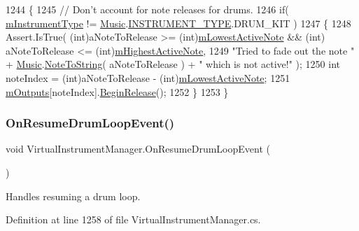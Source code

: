\begin{DoxyCode}
1244     \{
1245         \textcolor{comment}{// Don't account for note releases for drums.}
1246         \textcolor{keywordflow}{if}( \hyperlink{group___v_i_m_priv_ga108c350257b3a2080e06cd4a8251f6a4}{mInstrumentType} != \hyperlink{class_music}{Music}.\hyperlink{group___music_enums_gabfce60192305965558a36e368ebd67c3}{INSTRUMENT\_TYPE}.DRUM\_KIT )
1247         \{
1248             Assert.IsTrue( (\textcolor{keywordtype}{int})aNoteToRelease >= (\textcolor{keywordtype}{int})\hyperlink{group___v_i_m_priv_ga5e3a5116e0dabb37e0ea21d73ac1567e}{mLowestActiveNote} && (\textcolor{keywordtype}{int})
      aNoteToRelease <= (\textcolor{keywordtype}{int})\hyperlink{group___v_i_m_priv_ga73a09a4e4f09c0e5b3871dc9ad6c757e}{mHighestActiveNote},
1249                 \textcolor{stringliteral}{"Tried to fade out the note "} + \hyperlink{class_music}{Music}.\hyperlink{group___music_stat_func_ga85a22c905d56d4c5f4e62159bfecee8c}{NoteToString}( aNoteToRelease ) + \textcolor{stringliteral}{"
       which is not active!"} );
1250             \textcolor{keywordtype}{int} noteIndex = (int)aNoteToRelease - (\textcolor{keywordtype}{int})\hyperlink{group___v_i_m_priv_ga5e3a5116e0dabb37e0ea21d73ac1567e}{mLowestActiveNote};
1251             \hyperlink{group___v_i_m_priv_ga53f837fd01475fa35629a650e7fa00e3}{mOutputs}[noteIndex].\hyperlink{group___n_o_o_pub_func_ga044e62759958d717c7fa4fd1615e2ec1}{BeginRelease}();
1252         \}
1253     \}
\end{DoxyCode}
\mbox{\label{group___v_i_m_handlers_ga97e3e73e05a7ab6027f25573712367a2}} 
\subsubsection{\texorpdfstring{On\+Resume\+Drum\+Loop\+Event()}{OnResumeDrumLoopEvent()}}
{\footnotesize\ttfamily void Virtual\+Instrument\+Manager.\+On\+Resume\+Drum\+Loop\+Event (\begin{DoxyParamCaption}{ }\end{DoxyParamCaption})}



Handles resuming a drum loop. 



Definition at line 1258 of file Virtual\+Instrument\+Manager.\+cs.




